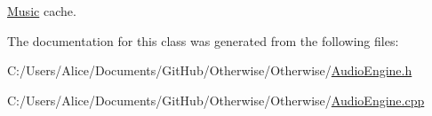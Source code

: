 \hyperlink{class_otherwise_1_1_music}{Music} cache. 



The documentation for this class was generated from the following files\+:\begin{DoxyCompactItemize}
\item 
C\+:/\+Users/\+Alice/\+Documents/\+Git\+Hub/\+Otherwise/\+Otherwise/\hyperlink{_audio_engine_8h}{Audio\+Engine.\+h}\item 
C\+:/\+Users/\+Alice/\+Documents/\+Git\+Hub/\+Otherwise/\+Otherwise/\hyperlink{_audio_engine_8cpp}{Audio\+Engine.\+cpp}\end{DoxyCompactItemize}
